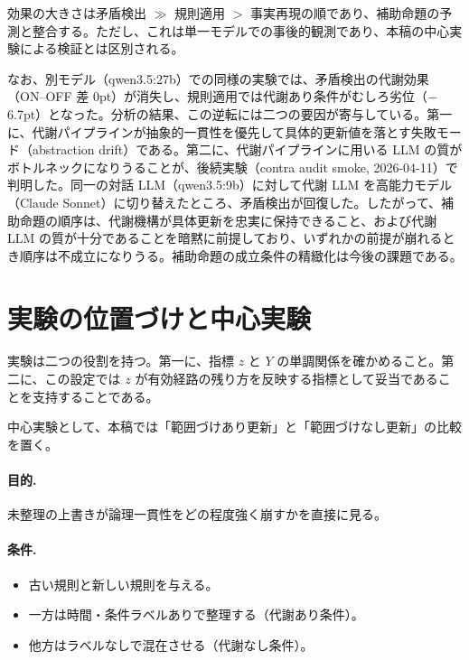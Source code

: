 \documentclass[12pt,a4paper]{article}
\begin{document}
効果の大きさは矛盾検出 $\gg$ 規則適用 $>$ 事実再現の順であり、補助命題の予測と整合する。ただし、これは単一モデルでの事後的観測であり、本稿の中心実験による検証とは区別される。

なお、別モデル（qwen3.5:27b）での同様の実験では、矛盾検出の代謝効果（ON--OFF 差 0pt）が消失し、規則適用では代謝あり条件がむしろ劣位（$-$6.7pt）となった。分析の結果、この逆転には二つの要因が寄与している。第一に、代謝パイプラインが抽象的一貫性を優先して具体的更新値を落とす失敗モード（abstraction drift）である。第二に、代謝パイプラインに用いる LLM の質がボトルネックになりうることが、後続実験（contra audit smoke, 2026-04-11）で判明した。同一の対話 LLM（qwen3.5:9b）に対して代謝 LLM を高能力モデル（Claude Sonnet）に切り替えたところ、矛盾検出が回復した。したがって、補助命題の順序は、代謝機構が具体更新を忠実に保持できること、および代謝 LLM の質が十分であることを暗黙に前提しており、いずれかの前提が崩れるとき順序は不成立になりうる。補助命題の成立条件の精緻化は今後の課題である。

\section{実験の位置づけと中心実験}

実験は二つの役割を持つ。第一に、指標 $z$ と $Y$ の単調関係を確かめること。第二に、この設定では $z$ が有効経路の残り方を反映する指標として妥当であることを支持することである。

中心実験として、本稿では「範囲づけあり更新」と「範囲づけなし更新」の比較を置く。

\paragraph{目的.} 未整理の上書きが論理一貫性をどの程度強く崩すかを直接に見る。

\paragraph{条件.}
\begin{itemize}
  \item 古い規則と新しい規則を与える。
  \item 一方は時間・条件ラベルありで整理する（代謝あり条件）。
  \item 他方はラベルなしで混在させる（代謝なし条件）。
\end{itemize}
\end{document}
